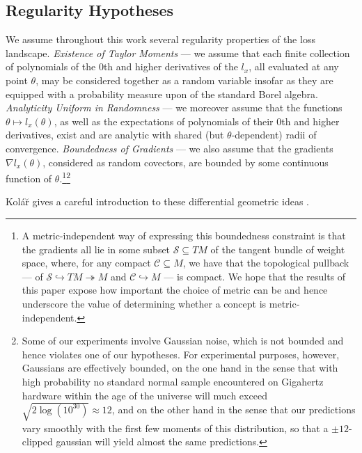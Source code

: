 \documentclass{article}
\newcommand{\Cc}{\mathcal{C}}
\newcommand{\Ss}{\mathcal{S}}
\begin{document}
    \subsection{Regularity Hypotheses}
        We assume throughout this work several regularity properties of the
        loss landscape.  \emph{Existence of Taylor Moments} --- we assume that
        each finite collection of polynomials of the $0$th and higher
        derivatives of the $l_x$, all evaluated at any point $\theta$, may be
        considered together as a random variable insofar
        as they are equipped with a probability measure upon of the standard
        Borel algebra.  \emph{Analyticity Uniform in Randomness} --- we
        moreover assume that the functions $\theta \mapsto l_x(\theta)$, as
        well as the expectations of polynomials of their $0$th and higher
        derivatives, exist and are analytic with shared (but
        $\theta$-dependent) radii of convergence.  \emph{Boundedness of
        Gradients} --- we also assume that the gradients $\nabla l_x(\theta)$,
        considered as random covectors, are bounded by some continuous function
        of $\theta$.\footnote{
            A metric-independent way of expressing this boundedness constraint
            is that the gradients all lie in some subset $\Ss \subseteq TM$ of
            the tangent bundle of weight space, where, for any compact $\Cc
            \subseteq M$, we have that the topological pullback --- of
            $\Ss \hookrightarrow TM \twoheadrightarrow M$
            and
            $\Cc \hookrightarrow M$ ---
            is compact.  We hope that the results of this paper expose how
            important the choice of metric can be and hence underscore the
            value of determining  whether a concept is metric-independent.
        }\footnote{
            Some of our experiments involve Gaussian noise, which is not
            bounded and hence violates one of our hypotheses.  For experimental
            purposes, however, Gaussians are effectively bounded, on the one
            hand in the sense that with high probability no standard normal
            sample encountered on Gigahertz hardware within the age of the
            universe will much exceed $\sqrt{2 \log(10^{30})} \approx 12$, and
            on the other hand in the sense that our predictions vary smoothly
            with the first few moments of this distribution, so that a $\pm
            12$-clipped gaussian will yield almost the same predictions.
        }

        Kol\'{a}\u{r} gives a careful introduction to these differential
        geometric ideas .
\end{document}
